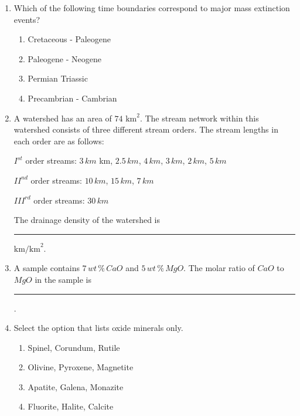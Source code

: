 \documentclass[journal,12pt,onecolumn]{IEEEtran}
\theoremstyle{remark}
\begin{document}
\begin{enumerate}
\item Which of the following time boundaries correspond to major mass extinction events? \hfill{}
\begin{enumerate}
    \item Cretaceous - Paleogene
    \item Paleogene - Neogene
    \item Permian Triassic
    \item Precambrian - Cambrian
\end{enumerate}

\item A watershed has an area of $74 \text{ km}^2$. The stream network within this watershed consists of three different stream orders. The stream lengths in each order are as follows: 

$I^{st}$ order streams: $3\,km$ km, $2.5\,km$, $4\,km$, $3\,km$, $2\,km$, $5\,km$ 

$II^{nd}$ order streams: $10\,km$, $15\,km$, $7\,km$ 

$III^{rd}$ order streams: $30\,km$ 

The drainage density of the watershed is \rule{3cm}{0.15mm} $\text{km/km}^2$.  \hfill{}

\item A sample contains $7\, wt\,\%\,CaO$ and $5\, wt\,\%\,MgO$. The molar ratio of $CaO$ to $MgO$ in the sample is \rule{3cm}{0.15mm}.  \hfill{}

\item Select the option that lists oxide minerals only. \hfill{}
\begin{enumerate}
    \item Spinel, Corundum, Rutile
    \item Olivine, Pyroxene, Magnetite
    \item Apatite, Galena, Monazite
    \item Fluorite, Halite, Calcite
\end{enumerate}


\end{enumerate}
\end{document}
